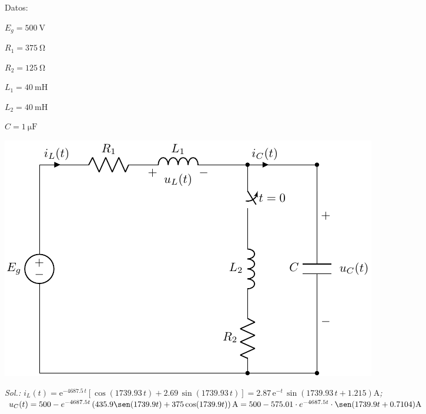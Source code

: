 \begin{enumerate}
\begin{minipage}{0.3\linewidth}
  Datos:

  $E_g = \SI{500}{\volt}$

  $R_{1}= \SI{375}{\ohm}$%

  $R_{2}=\SI{125}{\ohm}$%

  $L_1 = \SI{40}{\milli\henry}$%

  $L_2 = \SI{40}{\milli\henry}$%

  $C = \SI{1}{\micro\farad}$%
\end{minipage}
\begin{minipage}{0.7\linewidth}
  \includegraphics{../figs/E1_RLC.pdf}
\end{minipage}

\emph{Sol.:
  $i_L(t)=
  \mathrm{e}^{-4687.5\,t}\left[\cos(1739.93\,t)+2.69\,\sin(1739.93\,t)\right]=2.87\,\mathrm{e}^{-t}\,\sin\left(1739.93\,t+1.215\right)\unit{\ampere}$;
  $u_C(t) = 500 - e^{-4687.5 t} \left(435.9 \sen(1739.9t) + 375 \cos(1739.9 t)\right)\unit{\ampere} = 500 - 575.01 \cdot e^{-4687.5 t} \cdot  \sen(1739.9t + 0.7104)\unit{\ampere}$
  }

\end{enumerate}
